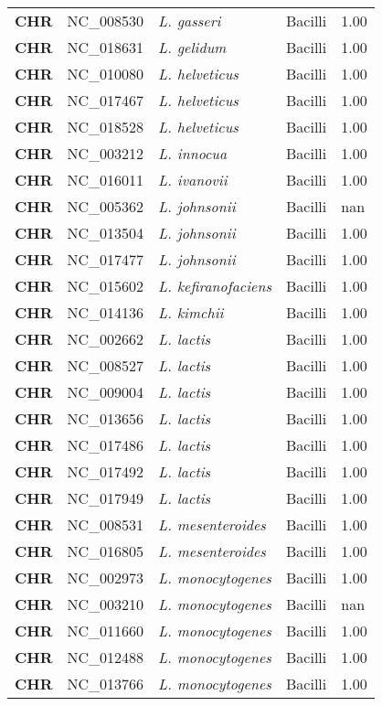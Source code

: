\begin{adjustwidth}{-3cm}{2cm}
{\begin{supertabular}{>{\bfseries}l|p{0.1\textwidth}p{0.14\textwidth}l|l}
CHR & NC\_008530 & \textit{L. gasseri} & Bacilli & 1.00\\
CHR & NC\_018631 & \textit{L. gelidum} & Bacilli & 1.00\\
CHR & NC\_010080 & \textit{L. helveticus} & Bacilli & 1.00\\
CHR & NC\_017467 & \textit{L. helveticus} & Bacilli & 1.00\\
CHR & NC\_018528 & \textit{L. helveticus} & Bacilli & 1.00\\
CHR & NC\_003212 & \textit{L. innocua} & Bacilli & 1.00\\
CHR & NC\_016011 & \textit{L. ivanovii} & Bacilli & 1.00\\
CHR & NC\_005362 & \textit{L. johnsonii} & Bacilli & nan\\
CHR & NC\_013504 & \textit{L. johnsonii} & Bacilli & 1.00\\
CHR & NC\_017477 & \textit{L. johnsonii} & Bacilli & 1.00\\
CHR & NC\_015602 & \textit{L. kefiranofaciens} & Bacilli & 1.00\\
CHR & NC\_014136 & \textit{L. kimchii} & Bacilli & 1.00\\
CHR & NC\_002662 & \textit{L. lactis} & Bacilli & 1.00\\
CHR & NC\_008527 & \textit{L. lactis} & Bacilli & 1.00\\
CHR & NC\_009004 & \textit{L. lactis} & Bacilli & 1.00\\
CHR & NC\_013656 & \textit{L. lactis} & Bacilli & 1.00\\
CHR & NC\_017486 & \textit{L. lactis} & Bacilli & 1.00\\
CHR & NC\_017492 & \textit{L. lactis} & Bacilli & 1.00\\
CHR & NC\_017949 & \textit{L. lactis} & Bacilli & 1.00\\
CHR & NC\_008531 & \textit{L. mesenteroides} & Bacilli & 1.00\\
CHR & NC\_016805 & \textit{L. mesenteroides} & Bacilli & 1.00\\
CHR & NC\_002973 & \textit{L. monocytogenes} & Bacilli & 1.00\\
CHR & NC\_003210 & \textit{L. monocytogenes} & Bacilli & nan\\
CHR & NC\_011660 & \textit{L. monocytogenes} & Bacilli & 1.00\\
CHR & NC\_012488 & \textit{L. monocytogenes} & Bacilli & 1.00\\
CHR & NC\_013766 & \textit{L. monocytogenes} & Bacilli & 1.00\\

\end{supertabular}}
\end{adjustwidth}
